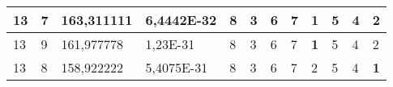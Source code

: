 \documentclass[conference]{IEEEtran}
\begin{document}
\begin{table*}[]
\begin{tabular}{|llll|llllllll|}
\multicolumn{1}{|l|}{13}                                                    & \multicolumn{1}{l|}{7}                                                        & \multicolumn{1}{l|}{163,311111}                                                   & 6,4442E-32                     & \multicolumn{1}{l|}{8}                                                  & \multicolumn{1}{l|}{3}                                                  & \multicolumn{1}{l|}{6}                                                  & \multicolumn{1}{l|}{7}                                                  & \multicolumn{1}{l|}{\textbf{1}}                                         & \multicolumn{1}{l|}{5}                                                  & \multicolumn{1}{l|}{4}                                                  & 2                          \\ \hline
\multicolumn{1}{|l|}{13}                                                    & \multicolumn{1}{l|}{9}                                                        & \multicolumn{1}{l|}{161,977778}                                                   & 1,23E-31                       & \multicolumn{1}{l|}{8}                                                  & \multicolumn{1}{l|}{3}                                                  & \multicolumn{1}{l|}{6}                                                  & \multicolumn{1}{l|}{7}                                                  & \multicolumn{1}{l|}{\textbf{1}}                                         & \multicolumn{1}{l|}{5}                                                  & \multicolumn{1}{l|}{4}                                                  & 2                          \\ \hline
\multicolumn{1}{|l|}{13}                                                    & \multicolumn{1}{l|}{8}                                                        & \multicolumn{1}{l|}{158,922222}                                                   & 5,4075E-31                     & \multicolumn{1}{l|}{8}                                                  & \multicolumn{1}{l|}{3}                                                  & \multicolumn{1}{l|}{6}                                                  & \multicolumn{1}{l|}{7}                                                  & \multicolumn{1}{l|}{2}                                                  & \multicolumn{1}{l|}{5}                                                  & \multicolumn{1}{l|}{4}                                                  & \textbf{1}                 \\ \hline

\end{tabular}
\end{table*}
\end{document}
